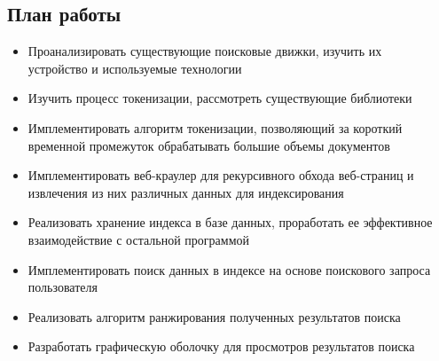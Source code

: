 \subsection{План работы}
\begin{itemize}
    \item{Проанализировать существующие поисковые движки, изучить их \\
    устройство и используемые технологии}
    \item {Изучить процесс токенизации, рассмотреть существующие библиотеки}
    \item {Имплементировать алгоритм токенизации, позволяющий за короткий временной промежуток обрабатывать большие объемы документов }
    \item {Имплементировать веб-краулер для рекурсивного обхода веб-страниц и извлечения из них различных данных для индексирования}
    \item {Реализовать хранение индекса в базе данных, проработать ее эффективное взаимодействие с остальной программой}
    \item {Имплементировать поиск данных в индексе на основе поискового запроса пользователя }
    \item {Реализовать алгоритм ранжирования полученных результатов поиска}
    \item {Разработать графическую оболочку для просмотров результатов поиска}
  \end{itemize}